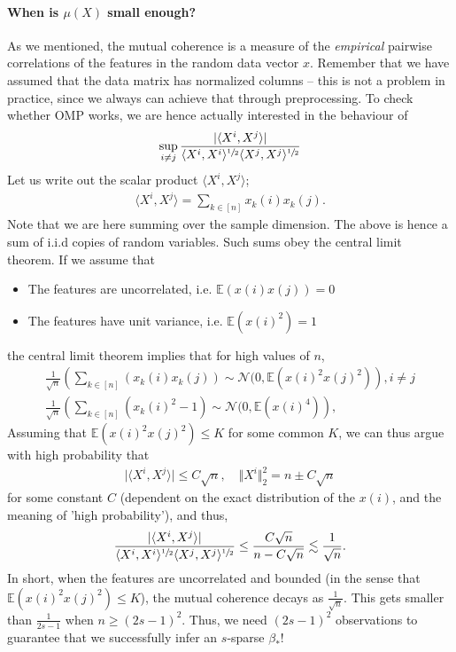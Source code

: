 \documentclass{article}
\newcommand{\sprod}[1]{\langle #1 \rangle}
\newcommand{\abs}[1]{\vert #1 \vert}
\newcommand{\norm}[1]{\Vert #1 \Vert}
\newcommand{\leqsim}{\lesssim}
\begin{document}
\paragraph{When is $\mu(X)$ small enough?} As we mentioned, the mutual coherence is a measure of the \emph{empirical} pairwise correlations of the features in the random data vector $x$. Remember that we have assumed that the data matrix has normalized columns --  this is not a problem in practice, since we always can achieve that through preprocessing. To check whether OMP works, we are hence actually interested in the behaviour of
\begin{align*}
    \sup_{i \neq j}  \frac{\abs{\sprod{X^i,X^j}}}{\sprod{X^i,X^i}^{\sfrac{1}{2}}\sprod{X^j,X^j}^{\sfrac{1}{2}}}
\end{align*}
Let us write out the scalar product $\sprod{X^i,X^j}$;
\begin{align*}
    \sprod{X^i,X^j} = \sum_{k \in [n]} x_k(i)x_k(j).
\end{align*}
Note that we are here summing over the sample dimension. The above is hence a sum of i.i.d copies of random variables.
Such sums obey the central limit theorem. If we assume that 
\begin{itemize}
    \item The features are uncorrelated, i.e. $\mathbb{E}(x(i)x(j))=0$
    \item The features have unit variance, i.e. $\mathbb{E}(x(i)^2)=1$
\end{itemize}
the central limit theorem implies that for high values of $n$,
\begin{align*}
    \frac{1}{\sqrt{n}} \left(\sum_{k \in [n]}\left(x_k(i)x_k(j)\right) \sim \mathcal{N}(0,\mathbb{E}(x(i)^2x(j)^2)\right), i \neq j \\
    \frac{1}{\sqrt{n}} \left(\sum_{k \in [n]}\left(x_k(i)^2- 1\right) \sim \mathcal{N}(0,\mathbb{E}(x(i)^4)\right),
\end{align*}
Assuming that $\mathbb{E}(x(i)^2x(j)^2)\leq K$ for some common $K$, we can thus argue with high probability that
\begin{align}
    \abs{\sprod{X^i,X^j}} \leq C \sqrt{n}, \quad \norm{X^i}_2^2 = n \pm C\sqrt{n}
\end{align}
for some constant $C$ (dependent on the exact distribution of the $x(i)$, and the meaning of 'high probability'), and thus,
\begin{align*}
     \frac{\abs{\sprod{X^i,X^j}}}{\sprod{X^i,X^i}^{\sfrac{1}{2}}\sprod{X^j,X^j}^{\sfrac{1}{2}}} \leq \frac{C\sqrt{n}}{n - C\sqrt{n}} \leqsim \frac{1}{\sqrt{n}}.
\end{align*}
In short, when the features are uncorrelated and bounded (in the sense that $\mathbb{E}(x(i)^2x(j)^2)\leq K$), the mutual coherence decays as $\frac{1}{\sqrt{n}}$. This gets smaller than $\frac{1}{2s-1}$ when $n\geq (2s-1)^2$. Thus, we need $(2s-1)^2$ observations to guarantee that we successfully infer an $s$-sparse $\beta_*$! 
\end{document}
